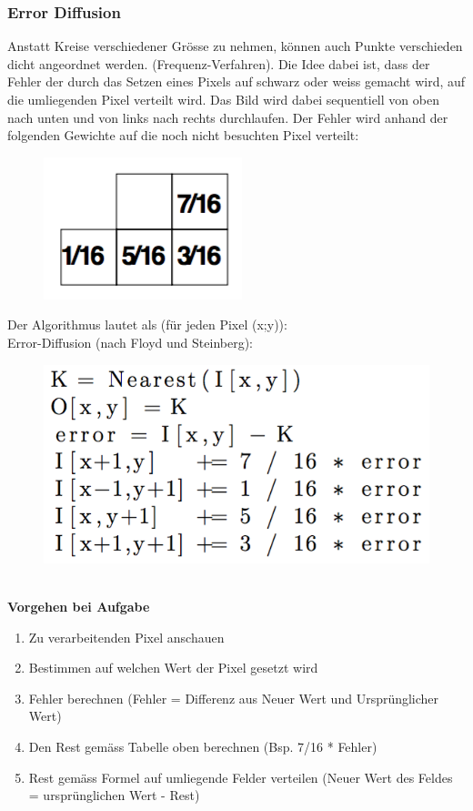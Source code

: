 \subsubsection{Error Diffusion}
Anstatt Kreise verschiedener Grösse zu nehmen, können auch Punkte verschieden dicht angeordnet werden. (Frequenz-Verfahren). Die Idee dabei ist, dass der Fehler der durch das Setzen eines Pixels auf schwarz oder weiss gemacht wird, auf die umliegenden Pixel verteilt wird. Das Bild wird dabei sequentiell von oben nach unten und von links nach rechts durchlaufen. Der Fehler wird anhand der folgenden Gewichte auf die noch nicht besuchten Pixel verteilt:\\
\begin{figure}[!ht]
\centering
\includegraphics[width=0.2\linewidth]{fig/errordif2}
\end{figure}
\noindent
Der Algorithmus lautet als (für jeden Pixel (x;y)):\\
Error-Diffusion (nach Floyd und Steinberg):\\
\begin{figure}[!ht]
\includegraphics[width=0.4\linewidth]{fig/errordif1}
\end{figure}\\
\noindent
\textbf{Vorgehen bei Aufgabe} \\
\begin{enumerate}
  \item Zu verarbeitenden Pixel anschauen
  \item Bestimmen auf welchen Wert der Pixel gesetzt wird
  \item Fehler berechnen (Fehler = Differenz aus Neuer Wert und Ursprünglicher Wert)
  \item Den Rest gemäss Tabelle oben berechnen (Bsp. 7/16 * Fehler)
  \item Rest gemäss Formel auf umliegende Felder verteilen (Neuer Wert des Feldes = ursprünglichen Wert - Rest)
\end{enumerate}

